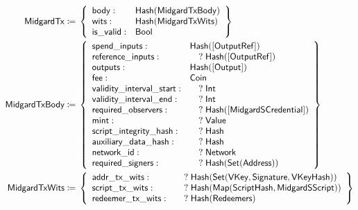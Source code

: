 \documentclass[../midgard.tex]{subfiles}
\begin{document}

\begingroup
\allowdisplaybreaks
\begin{align*}
    \mathsf{MidgardTx} \coloneq\;& \left\{
    \begin{array}{ll}
        \mathsf{body} : & \mathsf{Hash(MidgardTxBody)} \\
        \mathsf{wits} : & \mathsf{Hash(MidgardTxWits)} \\
        \mathsf{is\_valid} : & \mathsf{Bool} \\
    \end{array} \right\} \\
    \mathsf{MidgardTxBody} \coloneq\;& \left\{
    \begin{array}{ll}
        \mathsf{spend\_inputs} : & \mathsf{Hash([OutputRef])} \\
        \mathsf{reference\_inputs} : & \quad?\;\mathsf{Hash([OutputRef])} \\
        \mathsf{outputs} : & \mathsf{Hash([Output])} \\
        \mathsf{fee} : & \mathsf{Coin} \\
        \mathsf{validity\_interval\_start} : & \quad?\;\mathsf{Int} \\
        \mathsf{validity\_interval\_end} : & \quad?\;\mathsf{Int} \\
        \mathsf{required\_observers} : & \quad?\;\mathsf{Hash([MidgardSCredential])} \\
        \mathsf{mint} : & \quad?\;\mathsf{Value} \\
        \mathsf{script\_integrity\_hash} : & \quad?\;\mathsf{Hash} \\
        \mathsf{auxiliary\_data\_hash} : & \quad?\;\mathsf{Hash} \\
        \mathsf{network\_id} : & \quad?\;\mathsf{Network} \\
        \mathsf{required\_signers} : & \quad?\;\mathsf{Hash(Set(Address))} \\
    \end{array} \right\}\\
    \mathsf{MidgardTxWits} \coloneq\;& \left\{
    \begin{array}{ll}
        \mathsf{addr\_tx\_wits} : & \quad?\;\mathsf{Hash(Set(VKey, Signature, VKeyHash))} \\
        \mathsf{script\_tx\_wits} : & \quad?\;\mathsf{Hash(Map(ScriptHash, MidgardSScript))} \\
        \mathsf{redeemer\_tx\_wits} : & \quad?\;\mathsf{Hash(Redeemers)}
    \end{array} \right\}\\
\end{align*}
\endgroup
\end{document}

